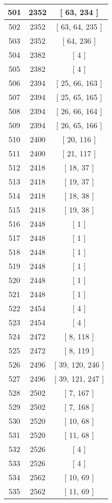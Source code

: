 \begin{center}
\begin{longtable}[H]{|| c c c ||}
\hline
501 & 2352 & [ 63, 234 ] \\ 
\hline
502 & 2352 & [ 63, 64, 235 ] \\ 
\hline
503 & 2352 & [ 64, 236 ] \\ 
\hline
504 & 2382 & [ 4 ] \\ 
\hline
505 & 2382 & [ 4 ] \\ 
\hline
506 & 2394 & [ 25, 66, 163 ] \\ 
\hline
507 & 2394 & [ 25, 65, 165 ] \\ 
\hline
508 & 2394 & [ 26, 66, 164 ] \\ 
\hline
509 & 2394 & [ 26, 65, 166 ] \\ 
\hline
510 & 2400 & [ 20, 116 ] \\ 
\hline
511 & 2400 & [ 21, 117 ] \\ 
\hline
512 & 2418 & [ 18, 37 ] \\ 
\hline
513 & 2418 & [ 19, 37 ] \\ 
\hline
514 & 2418 & [ 18, 38 ] \\ 
\hline
515 & 2418 & [ 19, 38 ] \\ 
\hline
516 & 2448 & [ 1 ] \\ 
\hline
517 & 2448 & [ 1 ] \\ 
\hline
518 & 2448 & [ 1 ] \\ 
\hline
519 & 2448 & [ 1 ] \\ 
\hline
520 & 2448 & [ 1 ] \\ 
\hline
521 & 2448 & [ 1 ] \\ 
\hline
522 & 2454 & [ 4 ] \\ 
\hline
523 & 2454 & [ 4 ] \\ 
\hline
524 & 2472 & [ 8, 118 ] \\ 
\hline
525 & 2472 & [ 8, 119 ] \\ 
\hline
526 & 2496 & [ 39, 120, 246 ] \\ 
\hline
527 & 2496 & [ 39, 121, 247 ] \\ 
\hline
528 & 2502 & [ 7, 167 ] \\ 
\hline
529 & 2502 & [ 7, 168 ] \\ 
\hline
530 & 2520 & [ 10, 68 ] \\ 
\hline
531 & 2520 & [ 11, 68 ] \\ 
\hline
532 & 2526 & [ 4 ] \\ 
\hline
533 & 2526 & [ 4 ] \\ 
\hline
534 & 2562 & [ 10, 69 ] \\ 
\hline
535 & 2562 & [ 11, 69 ] \\ 

\end{longtable}
\end{center}
